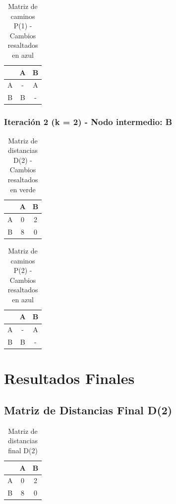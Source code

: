 \documentclass[12pt]{article}
\begin{document}
\begin{table}[h!]
\centering
\begin{tabular}{|c|c|c|}
\hline
 & A & B \\\hline
A & - & A \\\hline
B & B & - \\\hline
\end{tabular}
\caption{Matriz de caminos P(1) - Cambios resaltados en azul}
\end{table}

\clearpage
\subsubsection{Iteración 2 (k = 2) - Nodo intermedio: B}
\begin{table}[h!]
\centering
\begin{tabular}{|c|c|c|}
\hline
 & A & B \\\hline
A & 0 & 2 \\\hline
B & 8 & 0 \\\hline
\end{tabular}
\caption{Matriz de distancias D(2) - Cambios resaltados en verde}
\end{table}

\begin{table}[h!]
\centering
\begin{tabular}{|c|c|c|}
\hline
 & A & B \\\hline
A & - & A \\\hline
B & B & - \\\hline
\end{tabular}
\caption{Matriz de caminos P(2) - Cambios resaltados en azul}
\end{table}

\clearpage
\section{Resultados Finales}
\subsection{Matriz de Distancias Final D(2)}
\begin{table}[h!]
\centering
\begin{tabular}{|c|c|c|}
\hline
 & A & B \\\hline
A & 0 & 2 \\\hline
B & 8 & 0 \\\hline
\end{tabular}
\caption{Matriz de distancias final D(2)}
\end{table}
\end{document}
